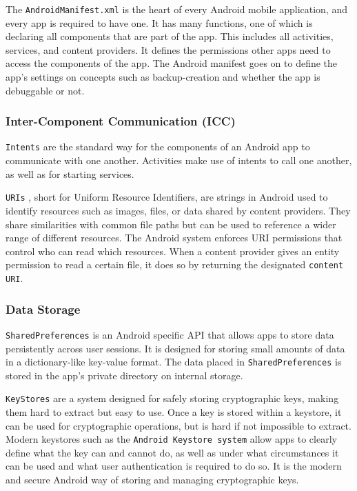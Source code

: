 The \texttt{AndroidManifest.xml} \cite{android_concepts_android_manifest} is the heart of every Android mobile application, and every app is required to have one. It has many functions, one of which is declaring all components that are part of the app. This includes all activities, services, and content providers. It defines the permissions other apps need to access the components of the app. The Android manifest goes on to define the app's settings on concepts such as backup-creation and whether the app is debuggable or not.


\subsubsection{Inter-Component Communication (ICC)}
\texttt{Intents} \cite{android_concepts_intents} are the standard way for the components of an Android app to communicate with one another. Activities make use of intents to call one another, as well as for starting services.

\texttt{URIs} \cite{android_concepts_uri}, short for Uniform Resource Identifiers, are strings in Android used to identify resources such as images, files, or data shared by content providers. They share similarities with common file paths but can be used to reference a wider range of different resources. The Android system enforces URI permissions that control who can read which resources. When a content provider gives an entity permission to read a certain file, it does so by returning the designated \texttt{content URI}.

\subsubsection{Data Storage}
\texttt{SharedPreferences} \cite{android_concepts_shared_preferences} is an Android specific API that allows apps to store data persistently across user sessions. It is designed for storing small amounts of data in a dictionary-like key-value format. The data placed in \texttt{SharedPreferences} is stored in the app's private directory on internal storage.

\texttt{KeyStores} are a system designed for safely storing cryptographic keys, making them hard to extract but easy to use. Once a key is stored within a keystore, it can be used for cryptographic operations, but is hard if not impossible to extract. Modern keystores such as the \texttt{Android Keystore system} \cite{android_concepts_android_keystore_system} allow apps to clearly define what the key can and cannot do, as well as under what circumstances it can be used and what user authentication is required to do so. It is the modern and secure Android way of storing and managing cryptographic keys.

